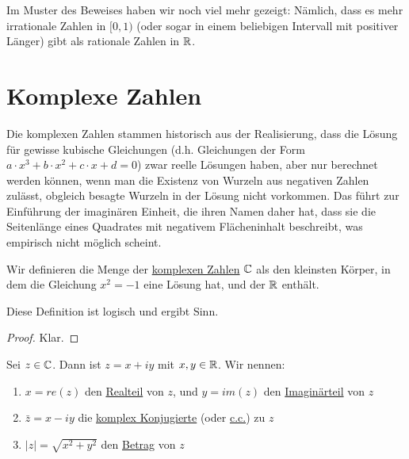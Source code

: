 \begin{remark}
    Im Muster des Beweises haben wir noch viel mehr gezeigt: Nämlich, dass es mehr irrationale Zahlen in $[0, 1)$ (oder sogar in einem beliebigen Intervall mit positiver Länger) gibt als rationale Zahlen in $\mathbb{R}$.
\end{remark}

\begin{theorem}
    \label{theorem-q-liegt-dicht-in-r}
\end{theorem}

\section{Komplexe Zahlen}

Die komplexen Zahlen stammen historisch aus der Realisierung, dass die Lösung für gewisse kubische Gleichungen (d.h. Gleichungen der Form $a \cdot x^3 + b \cdot x^2 + c \cdot x + d = 0$) zwar reelle Lösungen haben, aber nur berechnet werden können, wenn man die Existenz von Wurzeln aus negativen Zahlen zulässt, obgleich besagte Wurzeln in der Lösung nicht vorkommen. Das führt zur Einführung der imaginären Einheit, die ihren Namen daher hat, dass sie die Seitenlänge eines Quadrates mit negativem Flächeninhalt beschreibt, was empirisch nicht möglich scheint.

\begin{definition}
    Wir definieren die Menge der \underline{komplexen Zahlen} $\mathbb{C}$ als den kleinsten Körper, in dem die Gleichung $x^2 = -1$ eine Lösung hat, und der $\mathbb{R}$ enthält.
\end{definition}

\begin{corollary}
    Diese Definition ist logisch und ergibt Sinn.
\end{corollary}
\begin{proof}
    Klar.
\end{proof}

\begin{definition}
    Sei $z \in \mathbb{C}$. Dann ist $z = x + iy$ mit $x, y \in \mathbb{R}$. Wir nennen:
    \begin{enumerate}
        \item $x = re(z)$ den \underline{Realteil} von $z$, und $y = im(z)$ den \underline{Imaginärteil} von $z$
        \item $\bar{z} = x - iy$ die \underline{komplex Konjugierte} (oder \underline{c.c.}) zu $z$
        \item $|z| = \sqrt{x^2 + y^2}$ den \underline{Betrag} von $z$
    \end{enumerate}
\end{definition}

